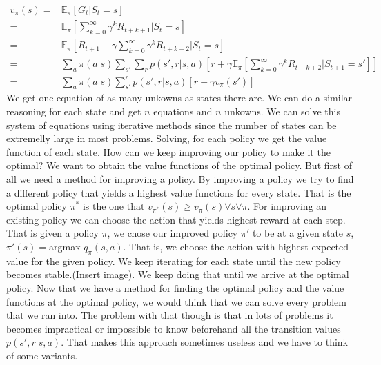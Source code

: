 \documentclass{article}
\begin{document}
\begin{equation}
	\begin{aligned}
	v_{\pi}(s) = {}&\mathbb{E}_{\pi}[G_{t}|S_{t} = s] \\
	={}& \mathbb{E}_{\pi}[\sum_{k = 0}^{\infty}\gamma^{k}R_{t+k+1}|S_{t} = s] \\
	= {}& \mathbb{E}_{\pi}[R_{t+1} + \gamma \sum_{k = 0}			^{\infty}\gamma^{k} R_{t+k+2}|S_{t} = s] \\	
	= {}& \sum_{a}^{}\pi(a|s) \sum_{s'}^{}	\sum_{r}^{}p(s',r|s,a)[r + \gamma \mathbb{E}_{\pi}[\sum_{k = 0}			^{\infty}\gamma^{k} R_{t+k+2}|S_{t+1} = s']]\\
	= {}& \sum_{a}^{}\pi(a|s) \sum_{s'}^{r}p(s',r|s,a)[r + \gamma v_{\pi}(s')]
	\end{aligned}	
\end{equation}
We get one equation of as many unkowns as states there are. We can do a similar reasoning for each state and get $n$ equations and $n$ unkowns. We can solve this system of equations using iterative methods since the number of states can be extremelly large in most problems. Solving, for each policy we get the value function of each state.\newline
How can we keep improving our policy to make it the optimal?\newline
We want to obtain the value functions of the optimal policy. But first of all we need a method for improving a policy. By improving a policy we try to find a different policy that yields a highest value functions for every state. That is the optimal policy $\pi ^{*}$ is the one that $v_{\pi^{*}}(s) \geq v_{\pi}(s) \forall s \forall \pi$.\newline
For improving an existing policy we can choose the action that yields highest reward at each step. That is given a policy $\pi$, we chose our improved policy $\pi'$ to be at a given state $s$,  $\pi'(s) = $argmax $q_{\pi}(s,a)$. \newline That is, we choose the action with highest expected value for the given policy. We keep iterating for each state until the new policy becomes stable.(Insert image). We keep doing that until we arrive at the optimal policy. 
Now that we have a method for finding the optimal policy and the value functions at the optimal policy, we would think that we can solve every problem that we ran into. The problem with that though is that in lots of problems it becomes impractical or impossible to know beforehand all the transition values $p(s',r|s,a)$.\newline
That makes this approach sometimes useless and we have to think of some variants. 
\end{document}
